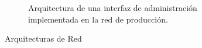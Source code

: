 \begin{figure}
\begin{subfigure}{.5\textwidth}
  \caption{Arquitectura de una interfaz de administración implementada en la red de producción.}
  \label{fig:interfaz_admon}
\end{subfigure}
\caption{Arquitecturas de Red}
\label{fig:Arq_red}
\end{figure}
